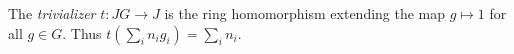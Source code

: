 The \textit{trivializer} $t: JG \to J$ is the ring homomorphism extending the map $g \mapsto 1$ for all $g \in G$. Thus $t(\sum_i n_i g_i) = \sum_i n_i$.
